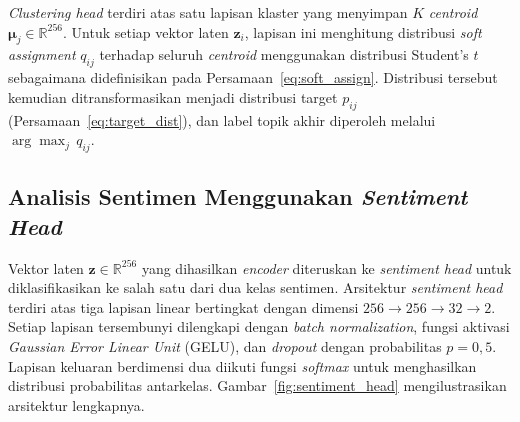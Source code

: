 \textit{Clustering head} terdiri atas satu lapisan klaster yang menyimpan
$K$ \textit{centroid} $\boldsymbol{\mu}_j \in \mathbb{R}^{256}$. Untuk
setiap vektor laten $\mathbf{z}_i$, lapisan ini menghitung distribusi
\textit{soft assignment} $q_{ij}$ terhadap seluruh \textit{centroid}
menggunakan distribusi Student's $t$ sebagaimana didefinisikan pada
Persamaan~\ref{eq:soft_assign}. Distribusi tersebut kemudian ditransformasikan 
menjadi distribusi target $p_{ij}$ (Persamaan~\ref{eq:target_dist}),
dan label topik akhir diperoleh melalui $\arg\max_j\, q_{ij}$.

\subsection{Analisis Sentimen Menggunakan \textit{Sentiment Head}}

Vektor laten $\mathbf{z} \in \mathbb{R}^{256}$ yang dihasilkan
\textit{encoder} diteruskan ke \textit{sentiment head} untuk
diklasifikasikan ke salah satu dari dua kelas sentimen. Arsitektur
\textit{sentiment head} terdiri atas tiga lapisan linear bertingkat
dengan dimensi $256 \to 256 \to 32 \to 2$. Setiap lapisan tersembunyi
dilengkapi dengan \textit{batch normalization}, fungsi aktivasi
\textit{Gaussian Error Linear Unit} (GELU), dan \textit{dropout} dengan
probabilitas $p = 0{,}5$. Lapisan keluaran berdimensi dua diikuti fungsi
\textit{softmax} untuk menghasilkan distribusi probabilitas antarkelas.
Gambar~\ref{fig:sentiment_head} mengilustrasikan arsitektur lengkapnya.

